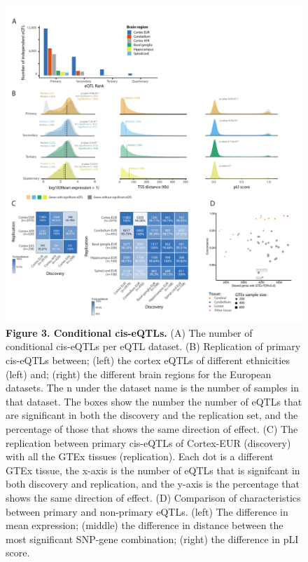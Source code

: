 \begin{figure}[H]
	\includegraphics[width=\textwidth]{chapters/chapter5-brain-eqtls/img/2020-12-02-fig3-ciseqtls-v12.pdf}
	\caption{\textbf{Figure 3. Conditional cis-eQTLs.} (A) The number of conditional cis-eQTLs per eQTL dataset. (B) Replication of primary cis-eQTLs between; (left) the cortex eQTLs of different ethnicities (left) and; (right) the different brain regions for the European datasets. The n under the dataset name is the number of samples in that dataset. The boxes show the number the number of eQTLs that are significant in both the discovery and the replication set, and the percentage of those that shows the same direction of effect. (C) The replication between primary cis-eQTLs of Cortex-EUR (discovery) with all the GTEx tissues (replication). Each dot is a different GTEx tissue, the x-axis is the number of eQTLs that is signifcant in both discovery and replication, and the y-axis is the percentage that shows the same direction of effect. (D) Comparison of characteristics between primary and non-primary eQTLs. (left) The difference in mean expression; (middle) the difference in distance between the most significant SNP-gene combination; (right) the difference in pLI score.}
\end{figure}

